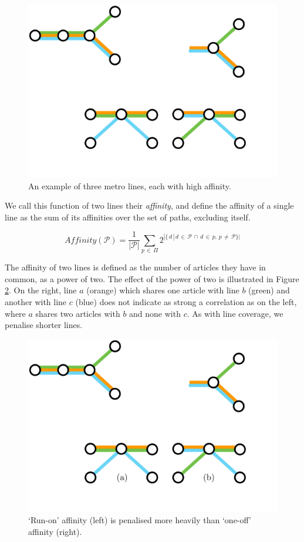 \begin{figure}[htbp!]
	\centering
	\includegraphics[width=.4\textwidth]{img/implementation/lowaffinity.pdf}
	\caption{An example of three metro lines, each with high affinity.}
	\label{fig:lowaffinity}
\end{figure}

We call this function of two lines their \textit{affinity}, and define the affinity of a single line as the sum of its affinities over the set of paths, excluding itself.

\begin{equation}
	Affinity(\mathcal{P}) = \frac{1}{|\mathcal{P}|} \sum_{p\,\in{\,\Pi}} 2^{|\{\,d\,|\,d\,\in\,{\mathcal{P}}\,\cap\,d\,\in\,{p},\,p\,\neq\,\mathcal{P}\}|}
\end{equation}

The affinity of two lines is defined as the number of articles they have in common, as a power of two. The effect of the power of two is illustrated in Figure \ref{fig:abcaffinity}. On the right, line $a$ (orange) which shares one article with line $b$ (green) and another with line $c$ (blue) does not indicate as strong a correlation as on the left, where $a$ shares two articles with $b$ and none with $c$. As with line coverage, we penalise shorter lines.

\begin{figure}[htbp!]
	\centering
	\includegraphics[width=.7\textwidth]{img/implementation/abcaffinity.pdf}
	\caption{`Run-on' affinity (left) is penalised more heavily than `one-off' affinity (right).}
	\label{fig:abcaffinity}
\end{figure}


